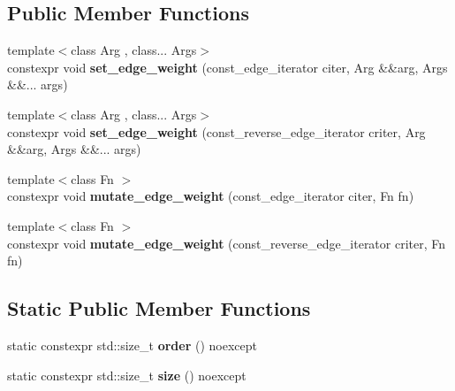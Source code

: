 \subsection*{Public Member Functions}
\begin{DoxyCompactItemize}
\item 
\mbox{\label{classsequoia_1_1maths_1_1heterogeneous__embedded__static__graph_ac0e792491e081f8c8ba162843e051819}} 
{\footnotesize template$<$class Arg , class... Args$>$ }\\constexpr void {\bfseries set\+\_\+edge\+\_\+weight} (const\+\_\+edge\+\_\+iterator citer, Arg \&\&arg, Args \&\&... args)
\item 
\mbox{\label{classsequoia_1_1maths_1_1heterogeneous__embedded__static__graph_a3f16c0921d7fd0d218c36dcd01f1267c}} 
{\footnotesize template$<$class Arg , class... Args$>$ }\\constexpr void {\bfseries set\+\_\+edge\+\_\+weight} (const\+\_\+reverse\+\_\+edge\+\_\+iterator criter, Arg \&\&arg, Args \&\&... args)
\item 
\mbox{\label{classsequoia_1_1maths_1_1heterogeneous__embedded__static__graph_abf85f31fdce6725b520b327aade04b8c}} 
{\footnotesize template$<$class Fn $>$ }\\constexpr void {\bfseries mutate\+\_\+edge\+\_\+weight} (const\+\_\+edge\+\_\+iterator citer, Fn fn)
\item 
\mbox{\label{classsequoia_1_1maths_1_1heterogeneous__embedded__static__graph_addb1de80af85f13d4c81aa8061741b46}} 
{\footnotesize template$<$class Fn $>$ }\\constexpr void {\bfseries mutate\+\_\+edge\+\_\+weight} (const\+\_\+reverse\+\_\+edge\+\_\+iterator criter, Fn fn)
\end{DoxyCompactItemize}
\subsection*{Static Public Member Functions}
\begin{DoxyCompactItemize}
\item 
\mbox{\label{classsequoia_1_1maths_1_1heterogeneous__embedded__static__graph_a19017e5b0d4b140da756dc32a7a8edc7}} 
static constexpr std\+::size\+\_\+t {\bfseries order} () noexcept
\item 
\mbox{\label{classsequoia_1_1maths_1_1heterogeneous__embedded__static__graph_ab6a9cdd6895386a8baa4b587f6c6f07a}} 
static constexpr std\+::size\+\_\+t {\bfseries size} () noexcept
\end{DoxyCompactItemize}
